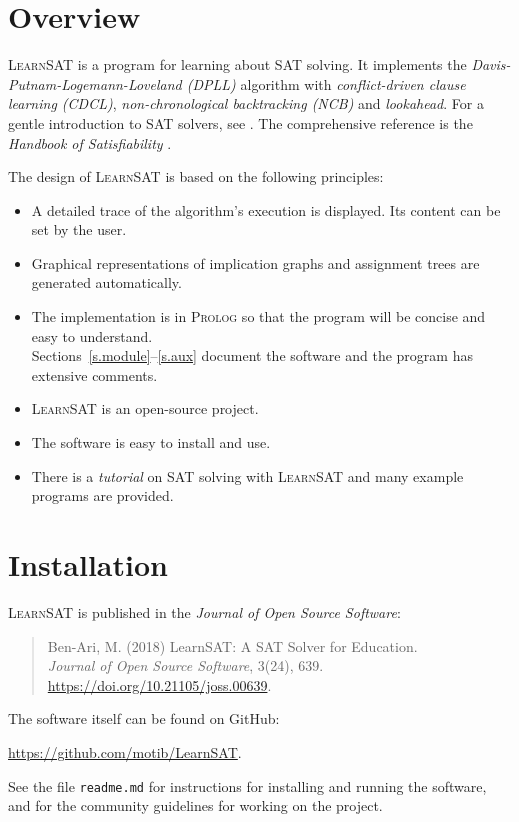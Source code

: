 \documentclass[11pt]{article}
\newcommand*{\ls}{\textsc{LearnSAT}}
\newcommand*{\pl}{\textsc{Prolog}}
\begin{document}
\section{Overview}

\ls{} is a program for learning about SAT solving. It implements the \emph{Davis-Putnam-Logemann-Loveland (DPLL)} algorithm with \emph{conflict-driven clause learning (CDCL)}, \emph{non-chronological backtracking (NCB)} and \emph{lookahead}. For a gentle introduction to SAT solvers, see \cite[Chapter~6]{mlcs}. The comprehensive reference is the \emph{Handbook of Satisfiability} \cite{SAT}.

The design of \ls{} is based on the following principles:

\begin{itemize}

\item A detailed trace of the algorithm's execution is
displayed. Its content can be set by the user.

\item Graphical representations of implication graphs and assignment
trees are generated automatically.

\item The implementation is in \pl{} so that the program will be concise and easy to understand.\\
Sections~\ref{s.module}--\ref{s.aux} document the software and the program has extensive comments. 

\item \ls{} is an open-source project.

\item The software is easy to install and use.

\item There is a \emph{tutorial} on SAT solving with \ls{} and many example programs are provided.
\end{itemize}

\section{Installation}

\ls{} is published in the \textit{Journal of Open Source Software}:
\begin{quote}
Ben-Ari, M. (2018) LearnSAT: A SAT Solver for Education.\\ \textit{Journal of Open Source Software}, 3(24), 639.\\\url{https://doi.org/10.21105/joss.00639}.
\end{quote}
The software itself can be found on GitHub:
\begin{center}
\url{https://github.com/motib/LearnSAT}.
\end{center}
See the file \texttt{readme.md} for instructions for installing and running the software, and for the community guidelines for working on the project.
\end{document}
